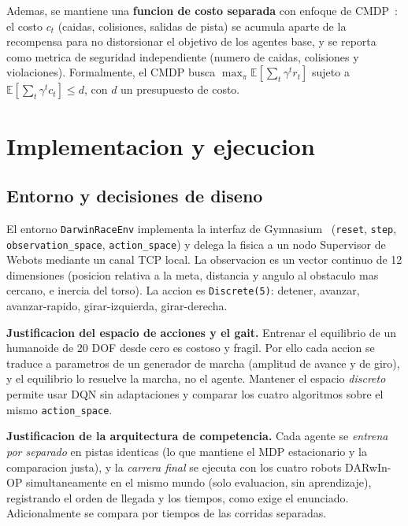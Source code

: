 \documentclass[conference]{IEEEtran}
\begin{document}
Ademas, se mantiene una \textbf{funcion de costo separada} con enfoque de
CMDP~\cite{cmdp}: el costo $c_t$ (caidas, colisiones, salidas de pista) se
acumula aparte de la recompensa para no distorsionar el objetivo de los agentes
base, y se reporta como metrica de seguridad independiente (numero de caidas,
colisiones y violaciones). Formalmente, el CMDP busca
$\max_\pi \mathbb{E}[\sum_t \gamma^t r_t]$ sujeto a
$\mathbb{E}[\sum_t \gamma^t c_t] \le d$, con $d$ un presupuesto de costo.

\section{Implementacion y ejecucion}
\label{sec:impl}

\subsection{Entorno y decisiones de diseno}
El entorno \texttt{DarwinRaceEnv} implementa la interfaz de
Gymnasium~\cite{gymnasium} (\texttt{reset}, \texttt{step},
\texttt{observation\_space}, \texttt{action\_space}) y delega la fisica a un
nodo Supervisor de Webots mediante un canal TCP local. La observacion es un
vector continuo de 12 dimensiones (posicion relativa a la meta, distancia y
angulo al obstaculo mas cercano, e inercia del torso). La accion es
\texttt{Discrete(5)}: detener, avanzar, avanzar-rapido, girar-izquierda,
girar-derecha.

\textbf{Justificacion del espacio de acciones y el gait.} Entrenar el equilibrio
de un humanoide de 20 DOF desde cero es costoso y fragil. Por ello cada accion
se traduce a parametros de un generador de marcha (amplitud de avance y de
giro), y el equilibrio lo resuelve la marcha, no el agente. Mantener el espacio
\emph{discreto} permite usar DQN sin adaptaciones y comparar los cuatro
algoritmos sobre el mismo \texttt{action\_space}.

\textbf{Justificacion de la arquitectura de competencia.} Cada agente se
\emph{entrena por separado} en pistas identicas (lo que mantiene el MDP
estacionario y la comparacion justa), y la \emph{carrera final} se ejecuta con
los cuatro robots DARwIn-OP simultaneamente en el mismo mundo (solo evaluacion,
sin aprendizaje), registrando el orden de llegada y los tiempos, como exige el
enunciado. Adicionalmente se compara por tiempos de las corridas separadas.
\end{document}
